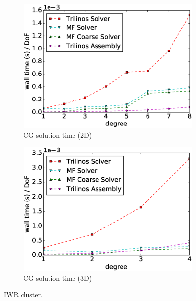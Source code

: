 \documentclass[preprint,12pt,times]{elsarticle}
\begin{document}
\begin{figure}[!ht]
\begin{subfigure}[b]{0.49\textwidth}
    \includegraphics[width=\textwidth]{IWR_solver2d.eps}
    \caption{CG solution time (2D)}
    \label{fig:benchmark_miehe_IWR_sol2}
  \end{subfigure}
  \begin{subfigure}[b]{0.49\textwidth}
    \centering
    \includegraphics[width=\textwidth]{IWR_solver3d.eps}
    \caption{CG solution time (3D)}
    \label{fig:benchmark_miehe_IWR_sol3}
  \end{subfigure}
  \caption{IWR cluster.}%
  \label{fig:benchmark_miehe_IWR_cg}
\end{figure}
\end{document}
